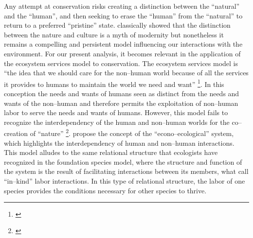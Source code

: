 \documentclass{article}
\begin{document}
{Any attempt at conservation risks creating a distinction between the ``natural'' and the ``human'', and then seeking to erase the ``human'' from the ``natural'' to return to a preferred ``pristine'' state. \citeauthor{latour_we_1993} classically showed that the distinction between the nature and culture is a myth of modernity but nonetheless it remains a compelling and persistent model influencing our interactions with the environment. For our present analysis, it becomes relevant in the application of the ecosystem services model to conservation. The ecosystem services model is ``the idea that we should care for the non--human world because of all the services it provides to humans to maintain the world we need and want'' \footnote{\cite{gibson-graham_non-human_2020}}. In this conception the needs and wants of humans seen as distinct from the needs and wants of the non--human and therefore permits the exploitation of non--human labor to serve the needs and wants of humans. However, this model fails to recognize the interdependency of the human and non--human worlds for the co--creation of ``nature'' \footnote{\cite{gibson-graham_non-human_2020, richardson_introduction_2014, krz_nonhuman_2020}}. \citeauthor{gibson-graham_non-human_2020} propose the concept of the ``econo--ecological'' system, which highlights the interdependency of human and non--human interactions. This model alludes to the same relational structure that ecologists have recognized in the foundation species model, where the structure and function of the system is the result of facilitating interactions between its members, what \citeauthor{gibson-graham_non-human_2020} call ``in--kind'' labor interactions. In this type of relational structure, the labor of one species provides the conditions necessary for other species to thrive. 

}
\end{document}
